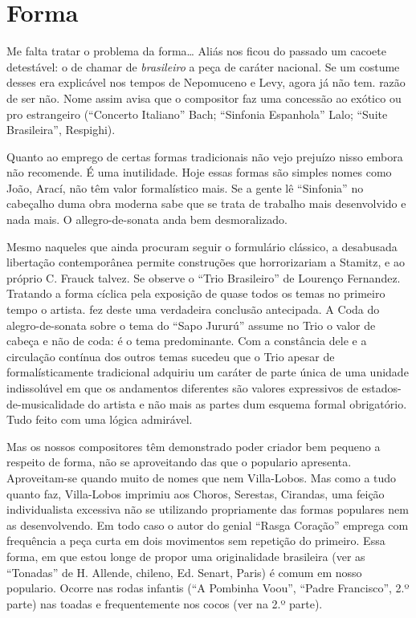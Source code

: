 \section{Forma}

Me falta tratar o problema da forma\ldots{} Aliás nos ficou do passado um
cacoete detestável: o de chamar de \emph{brasileiro} a peça de caráter
nacional. Se um costume desses era explicável nos tempos de Nepomuceno e
Levy, agora já não tem. razão de ser não. Nome assim avisa que o
compositor faz uma concessão ao exótico ou pro estrangeiro (``Concerto
Italiano'' Bach; ``Sinfonia Espanhola'' Lalo; ``Suite Brasileira'',
Respighi).

Quanto ao emprego de certas formas tradicionais não vejo prejuízo nisso
embora não recomende. É uma inutilidade. Hoje essas formas são simples
nomes como João, Arací, não têm valor formalístico mais. Se a gente lê
``Sinfonia'' no cabeçalho duma obra moderna sabe que se trata de trabalho
mais desenvolvido e nada mais. O allegro-de-sonata anda bem
desmoralizado.

Mesmo naqueles que ainda procuram seguir o formulário clássico, a
desabusada libertação contemporânea permite construções que
horrorizariam a Stamitz, e ao próprio C. Frauck talvez. Se observe o
``Trio Brasileiro'' de Lourenço Fernandez. Tratando a forma cíclica pela
exposição de quase todos os temas no primeiro tempo o artista. fez deste
uma verdadeira conclusão antecipada. A Coda do alegro-de-sonata sobre o
tema do ``Sapo Jururú'' assume no Trio o valor de cabeça e não de coda: é
o tema predominante. Com a constância dele e a circulação contínua dos
outros temas sucedeu que o Trio apesar de formalísticamente tradicional
adquiriu um caráter de parte única de uma unidade indissolúvel em que os
andamentos diferentes são valores expressivos de estados-de-musicalidade
do artista e não mais as partes dum esquema formal obrigatório. Tudo
feito com uma lógica admirável.

Mas os nossos compositores têm demonstrado poder criador bem pequeno a
respeito de forma, não se aproveitando das que o populario apresenta.
Aproveitam-se quando muito de nomes que nem Villa-Lobos. Mas como a tudo
quanto faz, Villa-Lobos imprimiu aos Choros, Serestas, Cirandas, uma
feição individualista excessiva não se utilizando propriamente das
formas populares nem as desenvolvendo. Em todo caso o autor do genial
``Rasga Coração'' emprega com frequência a peça curta em dois movimentos
sem repetição do primeiro. Essa forma, em que estou longe de propor uma
originalidade brasileira (ver as ``Tonadas'' de H. Allende, chileno, Ed.
Senart, Paris) é comum em nosso populario. Ocorre nas rodas infantis (``A
Pombinha Voou'', ``Padre Francisco'', 2.º parte) nas toadas e
frequentemente nos cocos (ver na 2.º parte).

